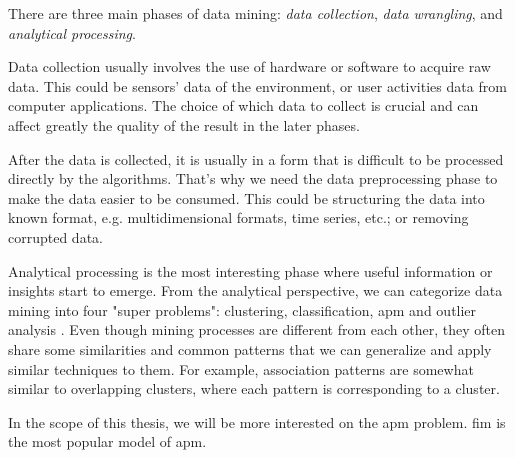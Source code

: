 There are three main phases of data mining: \textit{data collection}, \textit{data wrangling}, and \textit{analytical processing}.

Data collection usually involves the use of hardware or software to acquire raw data.
This could be sensors' data of the environment, or user activities data from computer applications.
The choice of which data to collect is crucial and can affect greatly the quality of the result in the later phases.

After the data is collected, it is usually in a form that is difficult to be processed directly by the algorithms.
That's why we need the data preprocessing phase to make the data easier to be consumed.
This could be structuring the data into known format, e.g. multidimensional formats, time series, etc.; or removing corrupted data.

Analytical processing is the most interesting phase where useful information or insights start to emerge.
From the analytical perspective, we can categorize data mining into four "super problems": clustering, classification, \ac{apm} and outlier analysis \citep{Aggarwal15}.
Even though mining processes are different from each other, they often share some similarities and common patterns that we can generalize and apply similar techniques to them.
For example, association patterns are somewhat similar to overlapping clusters, where each pattern is corresponding to a cluster.

In the scope of this thesis, we will be more interested on the \acl{apm} problem.
\Acl{fim} \citep{borgelt_fim_2012} is the most popular model of \acl{apm}.

